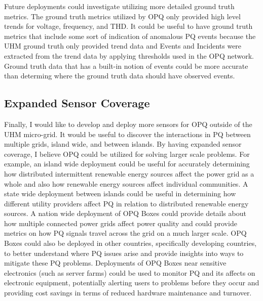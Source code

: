 Future deployments could investigate utilizing more detailed ground truth metrics. The ground truth metrics utilized by OPQ only provided high level trends for voltage, frequency, and THD. It could be useful to have ground truth metrics that include some sort of indication of anomalous PQ events because the UHM ground truth only provided trend data and Events and Incidents were extracted from the trend data by applying thresholds used in the OPQ network. Ground truth data that has a built-in notion of events could be more accurate than determing where the ground truth data should have observed events.

\subsection{Expanded Sensor Coverage}\label{subsec:expanded-sensor-coverage}
Finally, I would like to develop and deploy more sensors for OPQ outside of the UHM micro-grid. It would be useful to discover the interactions in PQ between multiple grids, island wide, and between islands. By having expanded sensor coverage, I believe OPQ could be utilized for solving larger scale problems. For example, an island wide deployment could be useful for accurately determining how distributed intermittent renewable energy sources affect the power grid as a whole and also how renewable energy sources affect individual communities. A state wide deployment between islands could be useful in determining how different utility providers affect PQ in relation to distributed renewable energy sources. A nation wide deployment of OPQ Boxes could provide details about how multiple connected power grids affect power quality and could provide metrics on how PQ signals travel across the grid on a much larger scale. OPQ Boxes could also be deployed in other countries, specifically developing countries, to better understand where PQ issues arise and provide insights into ways to mitigate these PQ problems. Deployments of OPQ Boxes near sensitive electronics (such as server farms) could be used to monitor PQ and its affects on electronic equipment, potentially alerting users to problems before they occur and providing cost savings in terms of reduced hardware maintenance and turnover.

